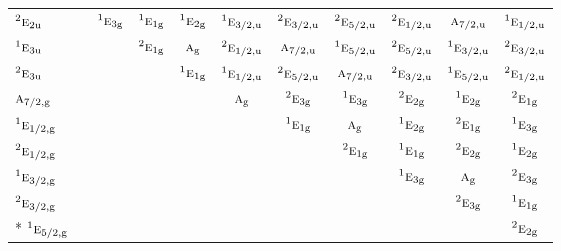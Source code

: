 \documentclass[10pt,a4paper]{article}
\numberwithin{equation}{section}
\newcommand{\irr}[1]{\text{\normalfont\scshape #1}}
\newcommand{\conjpair}[1]{{}^{#1}}
\newcommand{\ptag}[1]{\mathrm{#1}}
\begin{document}
{\begin{longtable}{@{}lcccccccccc@{}}
$\conjpair{2}\irr{e}_{2\ptag{u}}$ &  & $\conjpair{1}\irr{e}_{3\ptag{g}}$ & $\conjpair{1}\irr{e}_{1\ptag{g}}$ & $\conjpair{1}\irr{e}_{2\ptag{g}}$ & $\conjpair{1}\irr{e}_{3/2,\ptag{u}}$ & $\conjpair{2}\irr{e}_{3/2,\ptag{u}}$ & $\conjpair{2}\irr{e}_{5/2,\ptag{u}}$ & $\conjpair{2}\irr{e}_{1/2,\ptag{u}}$ & $\irr{a}_{7/2,\ptag{u}}$ & $\conjpair{1}\irr{e}_{1/2,\ptag{u}}$\\
$\conjpair{1}\irr{e}_{3\ptag{u}}$ &  &  & $\conjpair{2}\irr{e}_{1\ptag{g}}$ & $\irr{a}_{\ptag{g}}$ & $\conjpair{2}\irr{e}_{1/2,\ptag{u}}$ & $\irr{a}_{7/2,\ptag{u}}$ & $\conjpair{1}\irr{e}_{5/2,\ptag{u}}$ & $\conjpair{2}\irr{e}_{5/2,\ptag{u}}$ & $\conjpair{1}\irr{e}_{3/2,\ptag{u}}$ & $\conjpair{2}\irr{e}_{3/2,\ptag{u}}$\\
$\conjpair{2}\irr{e}_{3\ptag{u}}$ &  &  &  & $\conjpair{1}\irr{e}_{1\ptag{g}}$ & $\conjpair{1}\irr{e}_{1/2,\ptag{u}}$ & $\conjpair{2}\irr{e}_{5/2,\ptag{u}}$ & $\irr{a}_{7/2,\ptag{u}}$ & $\conjpair{2}\irr{e}_{3/2,\ptag{u}}$ & $\conjpair{1}\irr{e}_{5/2,\ptag{u}}$ & $\conjpair{2}\irr{e}_{1/2,\ptag{u}}$\\
$\irr{a}_{7/2,\ptag{g}}$ &  &  &  &  & $\irr{a}_{\ptag{g}}$ & $\conjpair{2}\irr{e}_{3\ptag{g}}$ & $\conjpair{1}\irr{e}_{3\ptag{g}}$ & $\conjpair{2}\irr{e}_{2\ptag{g}}$ & $\conjpair{1}\irr{e}_{2\ptag{g}}$ & $\conjpair{2}\irr{e}_{1\ptag{g}}$\\
$\conjpair{1}\irr{e}_{1/2,\ptag{g}}$ &  &  &  &  &  & $\conjpair{1}\irr{e}_{1\ptag{g}}$ & $\irr{a}_{\ptag{g}}$ & $\conjpair{1}\irr{e}_{2\ptag{g}}$ & $\conjpair{2}\irr{e}_{1\ptag{g}}$ & $\conjpair{1}\irr{e}_{3\ptag{g}}$\\
$\conjpair{2}\irr{e}_{1/2,\ptag{g}}$ &  &  &  &  &  &  & $\conjpair{2}\irr{e}_{1\ptag{g}}$ & $\conjpair{1}\irr{e}_{1\ptag{g}}$ & $\conjpair{2}\irr{e}_{2\ptag{g}}$ & $\conjpair{1}\irr{e}_{2\ptag{g}}$\\
$\conjpair{1}\irr{e}_{3/2,\ptag{g}}$ &  &  &  &  &  &  &  & $\conjpair{1}\irr{e}_{3\ptag{g}}$ & $\irr{a}_{\ptag{g}}$ & $\conjpair{2}\irr{e}_{3\ptag{g}}$\\
$\conjpair{2}\irr{e}_{3/2,\ptag{g}}$ &  &  &  &  &  &  &  &  & $\conjpair{2}\irr{e}_{3\ptag{g}}$ & $\conjpair{1}\irr{e}_{1\ptag{g}}$\\*
$\conjpair{1}\irr{e}_{5/2,\ptag{g}}$ &  &  &  &  &  &  &  &  &  & $\conjpair{2}\irr{e}_{2\ptag{g}}$\\
\bottomrule\end{longtable}}
\end{document}
